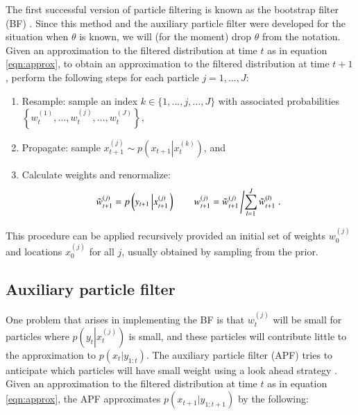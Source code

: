 \documentclass{elsarticle}
\begin{document}
The first successful version of particle filtering is known as the bootstrap filter (BF) \citep{Gord:Salm:Smit:nove:1993,Kita:mont:1996}. Since this method and the auxiliary particle filter were developed for the situation when $\theta$ is known, we will (for the moment) drop $\theta$ from the notation. Given an approximation to the filtered distribution at time $t$ as in equation \eqref{eqn:approx}, to obtain an approximation to the filtered distribution at time $t+1$, perform the following steps for each particle $j=1,\ldots,J$:

\begin{enumerate}
\item Resample: sample an index $k\in\{1,\ldots,j,\ldots,J\}$ with associated probabilities $\left\{w_t^{(1)},\ldots,w_t^{(j)},\ldots,w_t^{(J)}\right\}$,
\item Propagate: sample $x_{t+1}^{(j)} \sim p\left( x_{t+1}\left|x_t^{(k)}\right.\right)$, and
\item Calculate weights and renormalize:
\[ \tilde{w}_{t+1}^{(j)} = p\left(y_{t+1}\left|x_{t+1}^{(j)}\right.\right) \qquad w_{t+1}^{(j)} = \tilde{w}_{t+1}^{(j)}\left/ \sum_{l=1}^J \tilde{w}_{t+1}^{(l)} \right. .\]
\end{enumerate}

\noindent This procedure can be applied recursively provided an initial set of weights $w_0^{(j)}$ and locations $x_0^{(j)}$ for all $j$, usually obtained by sampling from the prior.

\subsection{Auxiliary particle filter \label{sec:apf}}

One problem that arises in implementing the BF is that $w_t^{(j)}$ will be small for particles where $p\left(y_{t}\left|x_{t}^{(j)}\right.\right)$ is small, and these particles will contribute little to the approximation to $p(x_{t}|y_{1:t})$. The auxiliary particle filter (APF) tries to anticipate which particles will have small weight using a look ahead strategy \citep{Pitt:Shep:filt:1999}. Given an approximation to the filtered distribution at time $t$ as in equation \eqref{eqn:approx}, the APF approximates $p(x_{t+1}|y_{1:t+1})$ by the following:
\end{document}
